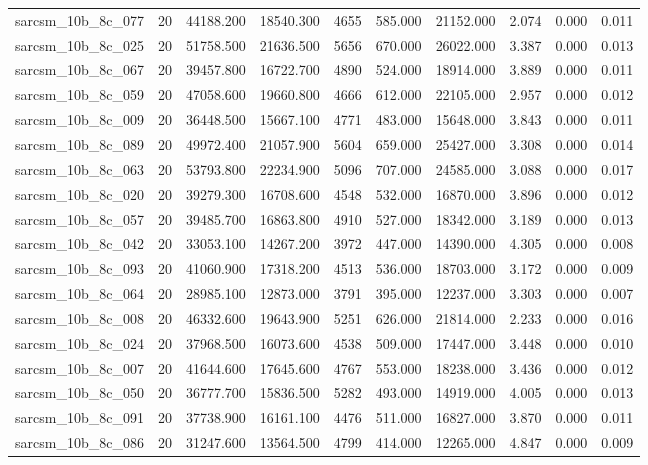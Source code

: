 \begin{tabular}{lrrrrrrrrr}
sarcsm\_10b\_8c\_077 & 20 & 44188.200 & 18540.300 & 4655 & 585.000 & 21152.000 & 2.074 & 0.000 & 0.011 \\
sarcsm\_10b\_8c\_025 & 20 & 51758.500 & 21636.500 & 5656 & 670.000 & 26022.000 & 3.387 & 0.000 & 0.013 \\
sarcsm\_10b\_8c\_067 & 20 & 39457.800 & 16722.700 & 4890 & 524.000 & 18914.000 & 3.889 & 0.000 & 0.011 \\
sarcsm\_10b\_8c\_059 & 20 & 47058.600 & 19660.800 & 4666 & 612.000 & 22105.000 & 2.957 & 0.000 & 0.012 \\
sarcsm\_10b\_8c\_009 & 20 & 36448.500 & 15667.100 & 4771 & 483.000 & 15648.000 & 3.843 & 0.000 & 0.011 \\
sarcsm\_10b\_8c\_089 & 20 & 49972.400 & 21057.900 & 5604 & 659.000 & 25427.000 & 3.308 & 0.000 & 0.014 \\
sarcsm\_10b\_8c\_063 & 20 & 53793.800 & 22234.900 & 5096 & 707.000 & 24585.000 & 3.088 & 0.000 & 0.017 \\
sarcsm\_10b\_8c\_020 & 20 & 39279.300 & 16708.600 & 4548 & 532.000 & 16870.000 & 3.896 & 0.000 & 0.012 \\
sarcsm\_10b\_8c\_057 & 20 & 39485.700 & 16863.800 & 4910 & 527.000 & 18342.000 & 3.189 & 0.000 & 0.013 \\
sarcsm\_10b\_8c\_042 & 20 & 33053.100 & 14267.200 & 3972 & 447.000 & 14390.000 & 4.305 & 0.000 & 0.008 \\
sarcsm\_10b\_8c\_093 & 20 & 41060.900 & 17318.200 & 4513 & 536.000 & 18703.000 & 3.172 & 0.000 & 0.009 \\
sarcsm\_10b\_8c\_064 & 20 & 28985.100 & 12873.000 & 3791 & 395.000 & 12237.000 & 3.303 & 0.000 & 0.007 \\
sarcsm\_10b\_8c\_008 & 20 & 46332.600 & 19643.900 & 5251 & 626.000 & 21814.000 & 2.233 & 0.000 & 0.016 \\
sarcsm\_10b\_8c\_024 & 20 & 37968.500 & 16073.600 & 4538 & 509.000 & 17447.000 & 3.448 & 0.000 & 0.010 \\
sarcsm\_10b\_8c\_007 & 20 & 41644.600 & 17645.600 & 4767 & 553.000 & 18238.000 & 3.436 & 0.000 & 0.012 \\
sarcsm\_10b\_8c\_050 & 20 & 36777.700 & 15836.500 & 5282 & 493.000 & 14919.000 & 4.005 & 0.000 & 0.013 \\
sarcsm\_10b\_8c\_091 & 20 & 37738.900 & 16161.100 & 4476 & 511.000 & 16827.000 & 3.870 & 0.000 & 0.011 \\
sarcsm\_10b\_8c\_086 & 20 & 31247.600 & 13564.500 & 4799 & 414.000 & 12265.000 & 4.847 & 0.000 & 0.009 \\

\end{tabular}
